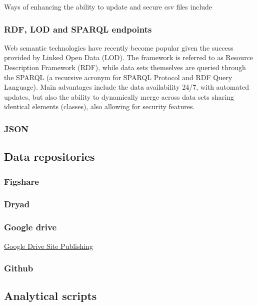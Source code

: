 \documentclass[twoside]{article}
\begin{document}
\begin{multicols}{2}
Ways of enhancing the ability  to update and secure csv files include %

\subsubsection{RDF, LOD and SPARQL endpoints}
Web semantic technologies have recently become popular given the success provided by Linked Open Data (LOD). The framework is referred to as Resource Description Framework (RDF), while data sets themselves are queried through the SPARQL (a recursive acronym for SPARQL Protocol and RDF Query Language). Main advantages include the data availability 24/7, with automated updates, but also the ability to dynamically merge across data sets sharing identical elements (classes), also allowing for security features. %

\subsubsection{JSON}

\subsection{Data repositories}

\subsubsection{Figshare}

\subsubsection{Dryad}

\subsubsection{Google drive}
\href{http://googleappsdeveloper.blogspot.com/2012/11/announcing-google-drive-site-publishing.html}{Google Drive Site Publishing
}

\subsubsection{Github}



\subsection{Analytical scripts}


\end{multicols}
\end{document}
